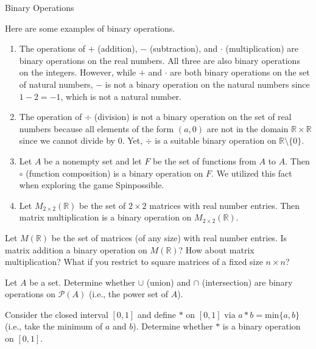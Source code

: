 \begin{section}{Binary Operations}
\begin{example}
Here are some examples of binary operations.
\begin{enumerate}[label=\rm{(\alph*)}]
\item The operations of $+$ (addition), $-$ (subtraction), and $\cdot$ (multiplication) are binary operations on the real numbers.  All three are also binary operations on the integers.  However, while $+$ and $\cdot$ are both binary operations on the set of natural numbers, $-$ is not a binary operation on the natural numbers since $1-2=-1$, which is not a natural number.
\item The operation of $\div$ (division) is not a binary operation on the set of real numbers because all elements of the form $(a,0)$ are not in the domain $\mathbb{R}\times \mathbb{R}$ since we cannot divide by 0.  Yet, $\div$ is a suitable binary operation on $\mathbb{R}\setminus \{0\}$.
\item Let $A$ be a nonempty set and let $F$ be the set of functions from $A$ to $A$.  Then $\circ$ (function composition) is a binary operation on $F$. We utilized this fact when exploring the game Spinpossible.
\item Let $M_{2\times 2}(\mathbb{R})$ be the set of $2\times 2$ matrices with real number entries.  Then matrix multiplication is a binary operation on $M_{2\times 2}(\mathbb{R})$.
\end{enumerate}
\end{example}

\begin{problem}
Let $M(\mathbb{R})$ be the set of matrices (of any size) with real number entries.  Is matrix addition a binary operation on $M(\mathbb{R})$?  How about matrix multiplication? What if you restrict to square matrices of a fixed size $n\times n$?
\end{problem}

\begin{problem}
Let $A$ be a set. Determine whether $\cup$ (union) and $\cap$ (intersection) are binary operations on $\mathcal{P}(A)$ (i.e., the power set of $A$).
\end{problem}

\begin{problem}
Consider the closed interval $[0,1]$ and define $*$ on $[0,1]$ via $a*b=\mathrm{min}\{a,b\}$ (i.e., take the minimum of $a$ and $b$).  Determine whether $*$ is a binary operation on $[0,1]$.
\end{problem}


\end{section}
